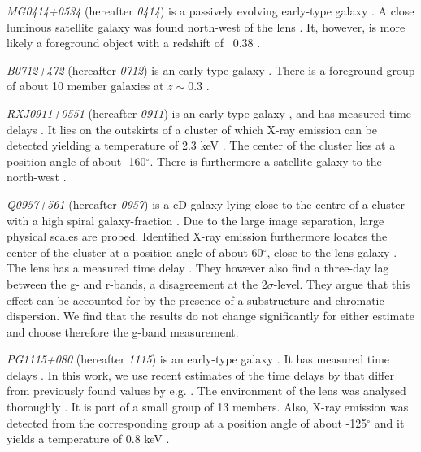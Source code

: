 \documentclass[useAMS,usenatbib]{mn2e}
\begin{document}
\textit{MG0414+0534} (hereafter \textit{0414}) is a passively evolving early-type galaxy \citep{1999AJ....117.2034T}. A close luminous satellite galaxy was found north-west of the lens \citep{1993AJ....105....1S}. It, however, is more likely a foreground object with a redshift of ~0.38 \citep{2011MNRAS.413L..86C}.

\textit{B0712+472} (hereafter \textit{0712}) is an early-type galaxy \citep{1998MNRAS.296..483J,1998AJ....115..377F}. There is a foreground group of about 10 member galaxies at $z\sim0.3$ \citep{2002AJ....123..627F}.

\textit{RXJ0911+0551} (hereafter \textit{0911}) is an early-type galaxy \citep{1997A&A...317L..13B,2012A&A...538A..99S}, and has measured time delays \citep{2002ApJ...572L..11H}. It lies on the outskirts of a cluster of which X-ray emission can be detected yielding a temperature of 2.3 keV \citep{2001ApJ...555....1M}. The center of the cluster lies at a position angle of about -160$^{\circ}$. There is furthermore a satellite galaxy to the north-west \citep{2000ApJ...544L..35K}.

\textit{Q0957+561} (hereafter \textit{0957}) is a cD galaxy lying close to the centre of a cluster with a high spiral galaxy-fraction \citep[e.g.][]{1992MNRAS.254P..27G,1994A&A...291..411A,1998ApJ...504..661C}. Due to the large image separation, large physical scales are probed. Identified X-ray emission furthermore locates the center of the cluster at a position angle of about 60$^{\circ}$, close to the lens galaxy \citep{2002ApJ...565...96C}. The lens has a measured time delay \citep[e.g.][]{2012A&A...540A.132S}. They however also find a three-day lag between the g- and r-bands, a disagreement at the 2$\sigma$-level. They argue that this effect can be accounted for by the presence of a substructure and chromatic dispersion. We find that the results do not change significantly for either estimate and choose therefore the g-band measurement.

\textit{PG1115+080} (hereafter \textit{1115}) is an early-type galaxy \citep{1980Natur.285..641W,2005ApJ...626...51Y}. It has measured time delays \citep[see e.g.][]{1997ApJ...475L..85S}. In this work, we use recent estimates of the time delays by \citet{2010MNRAS.406.2764T} that differ from previously found values by e.g. \citet{1997ApJ...489...21B}. The environment of the lens was analysed thoroughly \citep{2006ApJ...641..169M,2011ApJ...726...84W}. It is part of a small group of 13 members. Also, X-ray emission was detected from the corresponding group at a position angle of about -125$^{\circ}$ and it yields a temperature of 0.8 keV \citep{2004ApJ...610..686G}.
\end{document}
